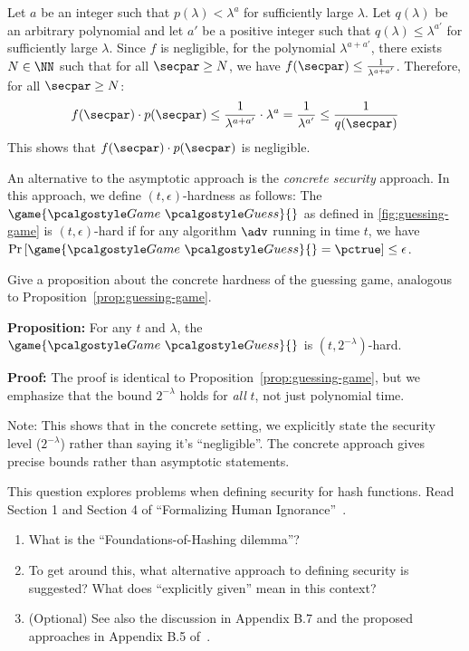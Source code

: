 \ifsolutions
\begin{mysolution}
  Let $a$ be an integer such that $p(\lambda) < \lambda^{a}$ for sufficiently large $\lambda$.
  Let $q(\lambda)$ be an arbitrary polynomial and let $a'$ be a positive integer such that $q(\lambda) \le \lambda^{a'}$ for sufficiently large $\lambda$.
  Since $f$ is negligible, for the polynomial $\lambda^{a + a'}$, there exists $N \in \NN$ such that for all $\secpar \ge N$, we have $f(\secpar) \le \frac{1}{\lambda^{a + a'}}$.
  Therefore, for all $\secpar \ge N$:
  \[
  f(\secpar) \cdot p(\secpar) \le \frac{1}{\lambda^{a + a'}} \cdot \lambda^{a} = \frac{1}{\lambda^{a'}} \le \frac{1}{q(\secpar)}
  \]
  This shows that $f(\secpar) \cdot p(\secpar)$ is negligible.
\end{mysolution}
\fi

\begin{exercise}[Optional]\label{ex:concrete-security}
  An alternative to the asymptotic approach is the \emph{concrete security} approach.
  In this approach, we define $(t,\epsilon)$-hardness as follows:
  The $\game{\Game~\algo{Guess}}{}$ as defined in \autoref{fig:guessing-game} is $(t,\epsilon)$-hard if for any algorithm $\adv$ running in time $t$, we have $\pr{\game{\Game~\algo{Guess}}{} = \pctrue} \le \epsilon$.
  
  Give a proposition about the concrete hardness of the guessing game, analogous to Proposition~\ref{prop:guessing-game}.
\end{exercise}

\ifsolutions
\begin{mysolution}
  \textbf{Proposition:} For any $t$ and $\lambda$, the $\game{\Game~\algo{Guess}}{}$ is $(t, 2^{-\lambda})$-hard.
  
  \textbf{Proof:} The proof is identical to Proposition~\ref{prop:guessing-game}, but we emphasize that the bound $2^{-\lambda}$ holds for \emph{all} $t$, not just polynomial time.
  
  Note: This shows that in the concrete setting, we explicitly state the security level ($2^{-\lambda}$) rather than saying it's ``negligible''.
  The concrete approach gives precise bounds rather than asymptotic statements.
\end{mysolution}
\fi

\begin{exercise}[Optional]\label{ex:foundations-hashing}
  This question explores problems when defining security for hash functions.
  Read Section 1 and Section 4 of ``Formalizing Human Ignorance''~\cite{VIETCRYPT:Rogaway06}.
  \begin{enumerate}
    \item What is the ``Foundations-of-Hashing dilemma''?
    \item To get around this, what alternative approach to defining security is suggested?
    What does ``explicitly given'' mean in this context?
    \item (Optional) See also the discussion in Appendix B.7 and the proposed approaches in Appendix B.5 of~\cite{AC:BerLan13}.
  \end{enumerate}
\end{exercise}

